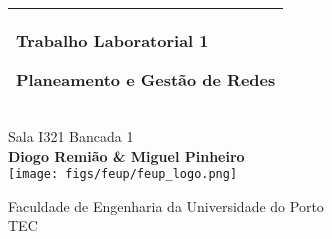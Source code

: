 %
%
%
%
%
\begin{titlepage}
  \addtolength{\hoffset}{0.5\evensidemargin-0.5\oddsidemargin} %
  \noindent%
  \begin{tabular}{@{}p{\textwidth}@{}}
    \toprule[2pt]
    \midrule
    \vspace{0.2cm}
    \begin{center}
    \Huge{\textbf{
        Trabalho Laboratorial 1 %
    }}
    \end{center}
    \begin{center}
      \Large{
        Planeamento e Gestão de Redes %
      }
    \end{center}
    \vspace{0.2cm}\\
    \midrule
    \toprule[2pt]
  \end{tabular}
  \vspace{2cm}
  \begin{center}
    {\large
    Sala I321 Bancada 1  %
    }\\
    \vspace{0.2cm}
    {\Large
      \textbf{Diogo Remião \& Miguel Pinheiro} \\ %
      \vspace{4cm}
      \texttt{[image: figs/feup/feup\_logo.png]}
    }
  \end{center}
  \vfill
  \begin{center}
  \vspace{0.5cm}
  Faculdade de Engenharia da Universidade do Porto\\
  TEC
  \end{center}
\end{titlepage}
\clearpage
